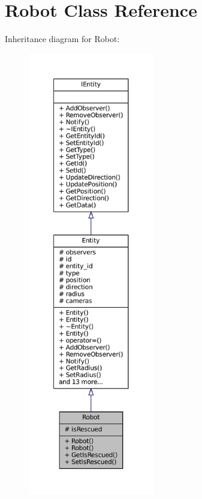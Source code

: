 \hypertarget{classRobot}{}\section{Robot Class Reference}
\label{classRobot}


Inheritance diagram for Robot\+:\nopagebreak
\begin{figure}[H]
\begin{center}
\leavevmode
\includegraphics[height=550pt]{classRobot__inherit__graph}
\end{center}
\end{figure}


